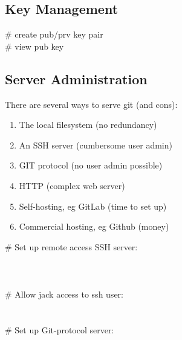 \subsection*{Key Management}
 \# create pub/prv key pair\\
 \# view pub key


\subsection*{Server Administration}
There are several ways to serve git (and cons):
\begin{enumerate}
    \item The local filesystem (no redundancy)
    \item An SSH server (cumbersome user admin)
    \item GIT protocol (no user admin possible)
    \item {} HTTP (complex web server)
    \item Self-hosting, eg GitLab (time to set up)
    \item Commercial hosting, eg Github (money)
\end{enumerate}

\# Set up remote access SSH server:\\
\\
\\
\\
\# Allow jack access to ssh user:\\
 \\
 \\
\# Set up Git-protocol server:\\
\\
